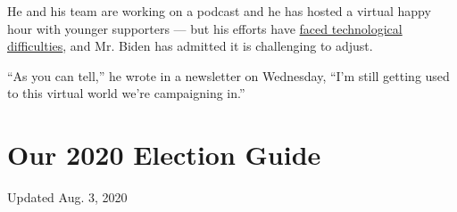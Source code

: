 He and his team are working on a podcast and he has hosted a virtual
happy hour with younger supporters --- but his efforts have
\href{https://www.nytimes.com/2020/03/13/us/politics/joe-biden-digital-campaign.html}{faced
technological difficulties}, and Mr. Biden has admitted it is
challenging to adjust.

``As you can tell,'' he wrote in a newsletter on Wednesday, ``I'm still
getting used to this virtual world we're campaigning in.''

\hypertarget{our-2020-election-guide}{%
\section{Our 2020 Election Guide}\label{our-2020-election-guide}}

Updated Aug. 3, 2020

